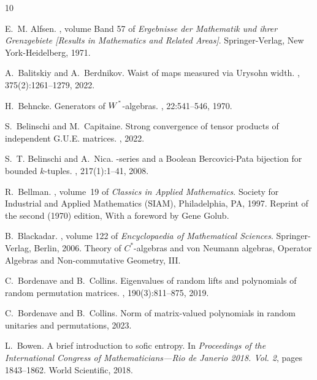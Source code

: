 \documentclass[10pt]{amsart}
\theoremstyle{definition}
\numberwithin{equation}{section}
\begin{document}
\begin{thebibliography}{10}

E.~M. Alfsen.
, volume Band 57 of {\em Ergebnisse der Mathematik und ihrer Grenzgebiete [Results in Mathematics and Related Areas]}.
\newblock Springer-Verlag, New York-Heidelberg, 1971.

A.~Balitskiy and A.~Berdnikov.
\newblock Waist of maps measured via {U}rysohn width.
, 375(2):1261--1279, 2022.

H.~Behncke.
\newblock Generators of {$W\sp{\sp*}$}-algebras.
, 22:541--546, 1970.

S.~Belinschi and M.~Capitaine.
\newblock Strong convergence of tensor products of independent {G.U.E.} matrices.
, 2022.

S.~T. Belinschi and A.~Nica.
\newblock {$\eta$}-series and a {B}oolean {B}ercovici-{P}ata bijection for bounded {$k$}-tuples.
, 217(1):1--41, 2008.

R.~Bellman.
, volume~19 of {\em Classics in Applied Mathematics}.
\newblock Society for Industrial and Applied Mathematics (SIAM), Philadelphia, PA, 1997.
\newblock Reprint of the second (1970) edition, With a foreword by Gene Golub.

B.~Blackadar.
, volume 122 of {\em Encyclopaedia of Mathematical Sciences}.
\newblock Springer-Verlag, Berlin, 2006.
\newblock Theory of $C^*$-algebras and von {N}eumann algebras, Operator Algebras and Non-commutative Geometry, III.

C.~Bordenave and B.~Collins.
\newblock Eigenvalues of random lifts and polynomials of random permutation matrices.
, 190(3):811--875, 2019.

C.~Bordenave and B.~Collins.
\newblock Norm of matrix-valued polynomials in random unitaries and permutations, 2023.

L.~Bowen.
\newblock A brief introduction to sofic entropy.
\newblock In {\em Proceedings of the {I}nternational {C}ongress of {M}athematicians---{R}io de Janerio 2018. {V}ol. 2}, pages 1843--1862. World Scientific, 2018.


\end{thebibliography}
\end{document}
